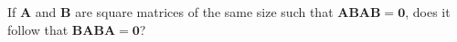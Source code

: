 If $\mathbf{A}$ and $\mathbf{B}$ are square matrices of the
same size such that $\mathbf{ABAB = 0}$, does it follow that
$\mathbf{BABA = 0}$?
